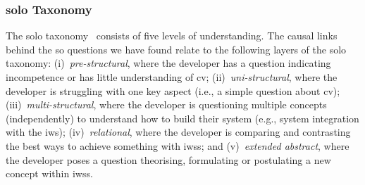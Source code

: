 \subsubsection{\gls{solo} Taxonomy}

The \gls{solo} taxonomy~\citep{Biggs:2014ur} consists of five levels of understanding. The causal links behind the \gls{so} questions we have found relate to the following layers of the \gls{solo} taxonomy:
%
(i)~\textit{pre-structural}, where the developer has a question indicating incompetence or has little understanding of \gls{cv};
%
(ii)~\textit{uni-structural}, where the developer is struggling with one key aspect (i.e., a simple question about \gls{cv});
%
(iii)~\textit{multi-structural}, where the developer is questioning multiple concepts (independently) to understand how to build their system (e.g., system integration with the \gls{iws});
%
(iv)~\textit{relational}, where the developer is comparing and contrasting the best ways to achieve something with \glspl{iws}; and
%
(v)~\textit{extended abstract}, where the developer poses a question theorising, formulating or postulating a new concept within \glspl{iws}.

